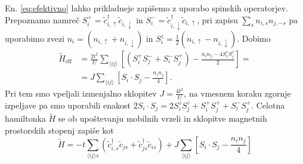 \documentclass[10pt,a4paper]{article}
\begin{document}
En. \eqref{eq:efektivno} lahko prikladneje zapišemo z uporabo spinskih operatorjev. Prepoznamo namreč $S_i^+=\tilde{c}^\dagger_{i,\uparrow}\tilde{c}_{i,\downarrow}$ in $S_i^-=\tilde{c}^\dagger_{i,\downarrow}\tilde{c}_{i,\uparrow}$, pri zapisu $\sum\limits_{s} n_{i,s}n_{j,-s}$ pa uporabimo zvezi $n_i=\left( n_{i,\uparrow} + n_{i, \downarrow}\right)$ in $S_i^z=\frac{1}{2}\left(n_{i, \uparrow} - n_{i, \downarrow} \right)$. Dobimo
\begin{equation}\label{eq:mat_elti}
\begin{split}
\tilde{H}_\mathrm{eff}& = \frac{2t^2}{U} \sum\limits_{\langle ij \rangle}\left[ \left( S_i^+S_j^- + S_i^-S_j^+\right) - \frac{n_i n_j - 4S_i^zS_j^z}{2}\right]=\\
&=J\sum\limits_{\langle ij \rangle} \left[ S_i\cdot  S_j - \frac{n_i n_j}{4}\right].
\end{split}
\end{equation}
Pri tem smo vpeljali izmenjalno sklopitev $J=\frac{4t^2}{U}$, na vmesnem koraku zgornje izpeljave pa smo uporabili enakost $2S_i\cdot S_j = 2S_i^z S_j^z + S_i^+S_j^+ + S_i^-S_j^+$. Celotna hamiltonka $\tilde{H}$ se ob upoštevanju mobilnih vrzeli in sklopitve magnetnih prostorskih stopenj zapiše kot 
\begin{equation}\label{eq:tjhamiltonka}
\tilde{H} = -t\sum\limits_{\langle ij \rangle s} \left(\tilde{c}^\dagger_{i,s} \tilde{c}_{js} + \tilde{c}^\dagger_{js}\tilde{c}_{is}\right) +  J\sum\limits_{\langle ij \rangle} \left[ S_i\cdot  S_j - \frac{n_i n_j}{4}\right]
\end{equation}
\end{document}
